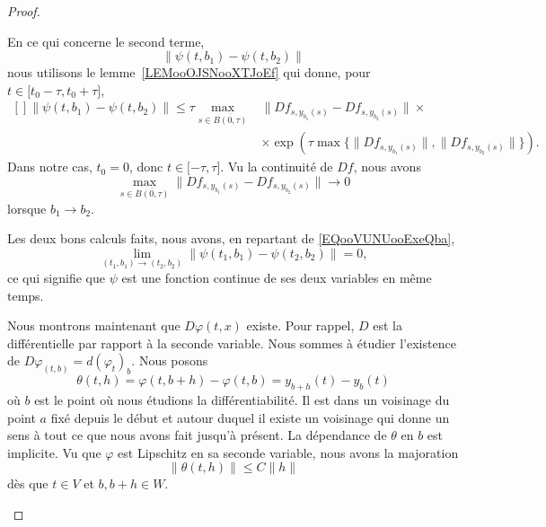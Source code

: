 \begin{proof}
\begin{subproof}
\begin{subproof}
			En ce qui concerne le second terme,
			\begin{equation}
				\| \psi(t,b_1)-\psi(t,b_2) \|
			\end{equation}
			nous utilisons le lemme~\ref{LEMooOJSNooXTJoEf} qui donne, pour \( t\in\mathopen[ t_0 -\tau, t_0+\tau \mathclose]\),
			\begin{equation}
				\begin{aligned}[]
					\| \psi(t,b_1)-\psi(t,b_2) \|\leq\tau\max_{s\in \overline{ B(0,\tau) }} & \| Df_{s,y_{b_1}(s)}-Df_{s,y_{b_2}(s)} \|\times                                          \\
					                                                                        & \times \exp\left( \tau\max\{ \| Df_{s,y_{b_1}(s)}\|, \| Df_{s,y_{b_2}(s)} \| \} \right).
				\end{aligned}
			\end{equation}
			Dans notre cas, \( t_0=0\), donc \( t\in\mathopen[ -\tau , \tau \mathclose]\). Vu la continuité de \( Df\), nous avons
			\begin{equation}
				\max_{s\in \overline{ B(0,\tau) }}\| Df_{s,y_{b_1}(s)}-Df_{s,y_{b_2}(s)} \|\to 0
			\end{equation}
			lorsque \( b_1\to b_2\).


			Les deux bons calculs faits, nous avons, en repartant de \eqref{EQooVUNUooExeQba},
			\begin{equation}
				\lim_{(t_1,b_1)\to(t_2,b_2)}\| \psi(t_1,b_1)-\psi(t_2,b_2) \|=0,
			\end{equation}
			ce qui signifie que \( \psi\) est une fonction continue de ses deux variables en même temps.
		\end{subproof}


		Nous montrons maintenant que \( D\varphi(t,x)\) existe. Pour rappel, \( D\) est la différentielle par rapport à la seconde variable. Nous sommes à étudier l'existence de \( D\varphi_{(t,b)}=d(\varphi_t)_b\). Nous posons
		\begin{equation}
			\theta(t,h)=\varphi(t,b+h)-\varphi(t,b)=y_{b+h}(t)-y_b(t)
		\end{equation}
		où \( b\) est le point où nous étudions la différentiabilité. Il est dans un voisinage du point \( a\) fixé depuis le début et autour duquel il existe un voisinage qui donne un sens à tout ce que nous avons fait jusqu'à présent. La dépendance de \( \theta\) en \( b\) est implicite. Vu que \( \varphi\) est Lipschitz en sa seconde variable, nous avons la majoration
		\begin{equation}        \label{EQooKYELooZlfeed}
			\| \theta(t,h) \|\leq C\| h \|
		\end{equation}
		dès que \( t\in V\) et \( b,b+h\in W\).


\end{subproof}
\end{proof}
